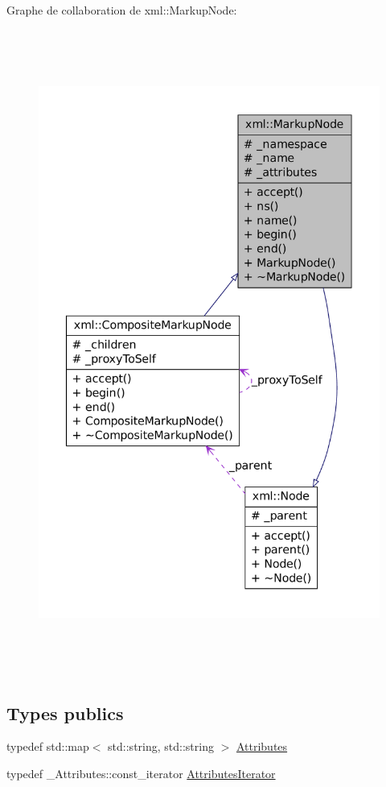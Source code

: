 Graphe de collaboration de xml::MarkupNode:
\nopagebreak
\begin{figure}[H]
\begin{center}
\leavevmode
\includegraphics[height=600pt]{classxml_1_1_markup_node__coll__graph}
\end{center}
\end{figure}
\subsection*{Types publics}
\begin{DoxyCompactItemize}
\item 
typedef std::map$<$ std::string, std::string $>$ \hyperlink{classxml_1_1_markup_node_ade6f6045d18042d1a87f80f308f177fb}{Attributes}
\item 
typedef \_\-Attributes::const\_\-iterator \hyperlink{classxml_1_1_markup_node_aab83830a10c767edbed9623af05e7a3c}{AttributesIterator}
\end{DoxyCompactItemize}
